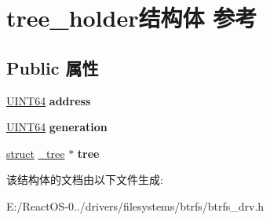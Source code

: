 \hypertarget{structtree__holder}{}\section{tree\+\_\+holder结构体 参考}
\label{structtree__holder}
\subsection*{Public 属性}
\begin{DoxyCompactItemize}
\item 
\mbox{\label{structtree__holder_a46fd8e545ad5b38dfc339e894fe2f3ed}} 
\hyperlink{_processor_bind_8h_a57be03562867144161c1bfee95ca8f7c}{U\+I\+N\+T64} {\bfseries address}
\item 
\mbox{\label{structtree__holder_a0d8754d1a502bd0a5114f03316fd2f37}} 
\hyperlink{_processor_bind_8h_a57be03562867144161c1bfee95ca8f7c}{U\+I\+N\+T64} {\bfseries generation}
\item 
\mbox{\label{structtree__holder_aa1debcb2a7e082e0a53d09b32bd1abef}} 
\hyperlink{interfacestruct}{struct} \hyperlink{struct__tree}{\+\_\+tree} $\ast$ {\bfseries tree}
\end{DoxyCompactItemize}


该结构体的文档由以下文件生成\+:\begin{DoxyCompactItemize}
\item 
E\+:/\+React\+O\+S-\/0../drivers/filesystems/btrfs/btrfs\+\_\+drv.\+h\end{DoxyCompactItemize}
